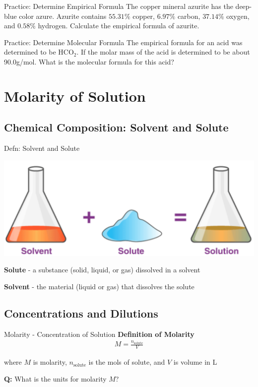 \documentclass[11pt]{beamer}
\begin{document}
\begin{frame}{Practice: Determine Empirical Formula}
  The copper mineral azurite has the deep-blue color azure. Azurite contains
  $55.31\%$ copper, $6.97\%$ carbon, $37.14\%$ oxygen, and $0.58\%$ hydrogen. Calculate the
  empirical formula of azurite.
  \vfill
\end{frame}

\begin{frame}{Practice: Determine Molecular Formula}
  The empirical formula for an acid was determined to be HCO$_2$. If the molar mass
  of the acid is determined to be about 90.0g/mol. What is the molecular formula for
  this acid?
  \vfill
\end{frame}

\section{Molarity of Solution}

\subsection{Chemical Composition: Solvent and Solute}

\begin{frame}{Defn: Solvent and Solute}
  \begin{center}
    \includegraphics[width=0.75\linewidth]{solut_solv.png}
  \end{center}

  \textbf{Solute} - a substance (solid, liquid, or gas) dissolved in
  a solvent

  \textbf{Solvent} - the material (liquid or gas) that dissolves the
  solute
\end{frame}

\subsection{Concentrations and Dilutions}

\begin{frame}{Molarity - Concentration of Solution}
  \textbf{Definition of Molarity}
  \begin{align}
    M = \frac{n_\text{solute}}{V}
  \end{align}

  where $M$ is molarity, $n_\text{solute}$ is the mols of solute, and $V$ is volume in L

  \textbf{Q:} What is the units for molarity $M$?
\end{frame}
\end{document}
